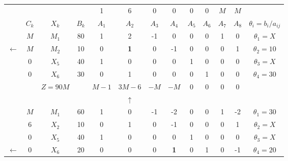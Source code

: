     \begin{tabular}{ccccccccccccc}
\cline{2-13}            &         &         &         & 1       & 6       & 0       & 0       & 0       & 0       & $M$     & $M$     &  \bigstrut[t]\\
            & $C_k$   & $X_k$   & $B_k$   & $A_1$   & $A_2$   & $A_3$   & $A_4$   & $A_5$   & $A_6$   & $A_7$   & $A_8$   & $\theta_i = b_i/a_{ij}$ \bigstrut[b]\\
\cline{2-13}            & $M$     & $M_1$   & 80      & 1       & 2       & -1      & 0       & 0       & 0       & 1       & 0       & $\theta_1 = X$ \bigstrut[t]\\
    $\leftarrow$ & $M$     & \textcolor[rgb]{ 1,  0,  0}{\boldmath{}\textbf{$M_2$}\unboldmath{}} & 10      & 0       & \textbf{1} & 0       & -1      & 0       & 0       & 0       & 1       & \boldmath{}\textbf{$\theta_2 = 10$}\unboldmath{} \\
            & 0       & $X_5$   & 40      & 1       & 0       & 0       & 0       & 1       & 0       & 0       & 0       & $\theta_3 = X$ \\
            & 0       & $X_6$   & 30      & 0       & 1       & 0       & 0       & 0       & 1       & 0       & 0       & $\theta_4 = 30$ \bigstrut[b]\\
\cline{2-13}            &         & $Z=90M$ &         & $M-1$   & \textcolor[rgb]{ 0,  .439,  .753}{\boldmath{}\textbf{$3M-6$}\unboldmath{}} & $-M$    & $-M$    & 0       & 0       & 0       & 0       &  \bigstrut\\
\cline{2-13}            &         &         &         &         & $\uparrow$ &         &         &         &         &         &         &  \bigstrut\\
\cline{2-13}            & $M$     & $M_1$   & 60      & 1       & 0       & -1      & -2      & 0       & 0       & 1       & -2      & $\theta_1 = 30$ \bigstrut[t]\\
            & 6       & $X_2$   & 10      & 0       & 1       & 0       & -1      & 0       & 0       & 0       & 1       & $\theta_2 = X$ \\
            & 0       & $X_5$   & 40      & 1       & 0       & 0       & 0       & 1       & 0       & 0       & 0       & $\theta_3 = X$ \\
    $\leftarrow$ & 0       & \textcolor[rgb]{ 1,  0,  0}{\boldmath{}\textbf{$X_6$}\unboldmath{}} & 20      & 0       & 0       & 0       & \textbf{1} & 0       & 1       & 0       & -1      & \boldmath{}\textbf{$\theta_4 = 20$}\unboldmath{} \bigstrut[b]\\

\end{tabular}
